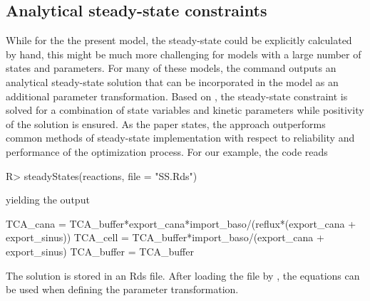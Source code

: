 \documentclass[article]{jss}
\begin{document}
\subsection{Analytical steady-state constraints}
While for the the present model, the steady-state could be explicitly calculated by hand, this might be much more challenging for models with a large number of states and parameters. For many of these models, the  command outputs an analytical steady-state solution that can be incorporated in the model as an additional parameter transformation. Based on \cite{rosenblatt2016customized}, the steady-state constraint is solved for a combination of state variables and kinetic parameters while positivity of the solution is ensured. As the paper states, the approach outperforms common methods of steady-state implementation with respect to reliability and performance of the optimization process. For our example, the code reads
\begin{CodeChunk}
\begin{CodeInput}
R> steadyStates(reactions, file = "SS.Rds")
\end{CodeInput}
\end{CodeChunk}
%
yielding the output
%
\begin{CodeChunk}
\begin{CodeOutput}
TCA_cana   = TCA_buffer*export_cana*import_baso/(reflux*(export_cana + 
             export_sinus))
TCA_cell   = TCA_buffer*import_baso/(export_cana + export_sinus)
TCA_buffer = TCA_buffer
\end{CodeOutput}
\end{CodeChunk}
%
The solution is stored in an Rds file. After loading the file by , the equations can be used when defining the parameter transformation.



{}
\end{document}
